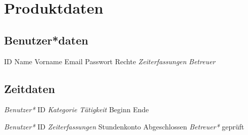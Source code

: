 \section{Produktdaten}

\subsection{Benutzer*daten}
\begin{requirements}
	\begin{requirements}
		 ID
		 Name
		 Vorname
		 Email
		 Passwort
		 Rechte
		 \emph{Zeiterfassungen}
		 \emph{Betreuer}
	\end{requirements}
\end{requirements}

\subsection{Zeitdaten}
\begin{requirements}
	\req [Zeiterfassung] {D20}
	\begin{requirements}
		 \emph{Benutzer*} ID
		 \emph{Kategorie}
		 \emph{Tätigkeit}
		 Beginn
		 Ende
	\end{requirements}

	\req [Stundenzettel] {D30}
	\begin{requirements}
		 \emph{Benutzer*} ID
		 \emph{Zeiterfassungen}
		 Stundenkonto
		 Abgeschlossen
		 \emph{Betreuer*} geprüft
	\end{requirements}
\end{requirements}


